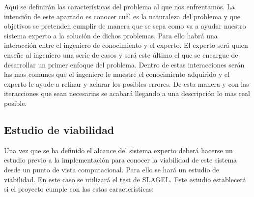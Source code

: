 Aquí se definirán las características del problema al que nos enfrentamos.
 La intención de este apartado es conocer cuál es la naturaleza del problema
 y que objetivos se pretenden cumplir de manera que se sepa como va a ayudar
 nuestro sistema experto a la solución de dichos problemas. Para ello habrá
 una interacción entre el ingeniero de conocimiento y el experto. El experto
 será quien enseñe al ingeniero una serie de casos y será este último el que se
 encargue de desarrollar un primer enfoque del problema. Dentro de estas interacciones
 serán las mas comunes que el ingeniero le muestre el conocimiento adquirido
 y el experto le ayude a refinar y aclarar los posibles errores. De esta manera
 y con las iteracciones que sean necesarias se acabará llegando a una descripción
 lo mas real posible.



\subsection{Estudio de viabilidad}

Una vez que se ha definido el alcance del sistema experto deberá hacerse un estudio
 previo a la implementación para conocer la viabilidad de este sistema desde un punto
 de vista computacional. Para ello se hará un estudio de viabilidad. En este caso se
 utilizará el test de SLAGEL. Este estudio establecerá si el proyecto cumple con las
 estas características:


